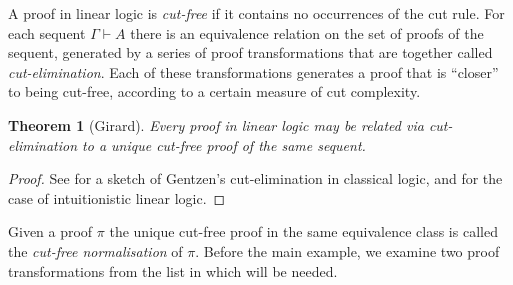 \documentclass[english,letter paper,12pt,reqno]{article}
\newtheorem{theorem}{Theorem}[section]
\theoremstyle{example}
\numberwithin{equation}{section}
\begin{document}
A proof in linear logic is \emph{cut-free} if it contains no occurrences of the cut rule. For each sequent $\Gamma \vdash A$ there is an equivalence relation on the set of proofs of the sequent, generated by a series of proof transformations that are together called \emph{cut-elimination}. Each of these transformations generates a proof that is ``closer'' to being cut-free, according to a certain measure of cut complexity.

\begin{theorem}[Girard] Every proof in linear logic may be related via cut-elimination to a unique cut-free proof of the same sequent.
\end{theorem}
\begin{proof}
See \cite[Chapter 13]{girard_prooftypes} for a sketch of Gentzen's cut-elimination in classical logic, and \cite[\S 3]{mellies} for the case of intuitionistic linear logic.
\end{proof}

Given a proof $\pi$ the unique cut-free proof in the same equivalence class is called the \emph{cut-free normalisation} of $\pi$. Before the main example, we examine two proof transformations from the list in \cite[Section 3]{mellies} which will be needed.
\end{document}
